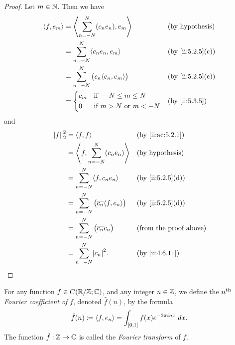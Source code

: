 \begin{proof}
  Let \(m \in \N\).
  Then we have
  \begin{align*}
    \inner*{f, e_m} & = \inner*{\sum_{n = -N}^N (c_n e_n), e_m}         &  & \text{(by hypothesis)} \\
                    & = \sum_{n = -N}^N \inner*{c_n e_n, e_m}           &  & \by{ii:5.2.5}[c]       \\
                    & = \sum_{n = -N}^N \big(c_n \inner*{e_n, e_m}\big) &  & \by{ii:5.2.5}[c]       \\
                    & = \begin{dcases}
                          c_m & \text{if } -N \leq m \leq N         \\
                          0   & \text{if } m > N \text{ or } m < -N
                        \end{dcases}      &  & \by{ii:5.3.5}
  \end{align*}
  and
  \begin{align*}
    \norm*{f}_2^2 & = \inner*{f, f}                                            &  & \by{ii:ac:5.2.1}              \\
                  & = \inner*{f, \sum_{n = -N}^N (c_n e_n)}                    &  & \text{(by hypothesis)}        \\
                  & = \sum_{n = -N}^N \inner*{f, c_n e_n}                      &  & \by{ii:5.2.5}[d]              \\
                  & = \sum_{n = -N}^N \big(\overline{c_n} \inner*{f, e_n}\big) &  & \by{ii:5.2.5}[d]              \\
                  & = \sum_{n = -N}^N \big(\overline{c_n} c_n\big)             &  & \text{(from the proof above)} \\
                  & = \sum_{n = -N}^N \abs{c_n}^2.                             &  & \by{ii:4.6.11}
  \end{align*}
\end{proof}

\begin{defn}\label{ii:5.3.7}
  For any function \(f \in C(\R / \Z ; \C)\), and any integer \(n \in \Z\), we define the \(n^{\opTh}\) \emph{Fourier coefficient of} \(f\), denoted \(\hat{f}(n)\), by the formula
  \[
    \hat{f}(n) \coloneqq \inner*{f, e_n} = \int_{[0, 1]} f(x) e^{- 2 \pi i n x} \; dx.
  \]
  The function \(\hat{f} : \Z \to \C\) is called the \emph{Fourier transform} of \(f\).
\end{defn}

